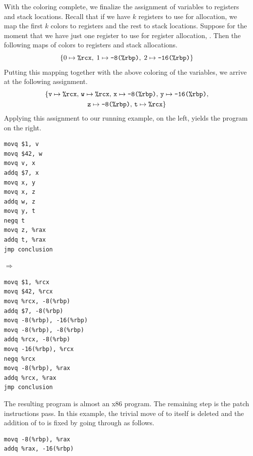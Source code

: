 \documentclass[11pt]{book}
\begin{document}
With the coloring complete, we finalize the assignment of variables to
registers and stack locations. Recall that if we have $k$ registers to
use for allocation, we map the first $k$ colors to registers and the
rest to stack locations.  Suppose for the moment that we have just one
register to use for register allocation, . Then the following
maps of colors to registers and stack allocations.
\[
  \{ 0 \mapsto \texttt{\%rcx}, \; 1 \mapsto \texttt{-8(\%rbp)}, \; 2 \mapsto \texttt{-16(\%rbp)} \}
\]
Putting this mapping together with the above coloring of the
variables, we arrive at the following assignment.
\begin{gather*}
  \{ \mathtt{v} \mapsto \texttt{\%rcx}, \,
     \mathtt{w} \mapsto \texttt{\%rcx},  \,
     \mathtt{x} \mapsto \texttt{-8(\%rbp)}, \,
     \mathtt{y} \mapsto \texttt{-16(\%rbp)}, \\
     \mathtt{z} \mapsto \texttt{-8(\%rbp)}, \,
     \mathtt{t} \mapsto \texttt{\%rcx} \}
\end{gather*}
Applying this assignment to our running example, on the left, yields
the program on the right.
\begin{center}
  \begin{minipage}{0.3\textwidth}
\begin{lstlisting}
movq $1, v
movq $42, w
movq v, x
addq $7, x
movq x, y
movq x, z
addq w, z
movq y, t
negq t
movq z, %rax
addq t, %rax
jmp conclusion
\end{lstlisting}
\end{minipage}
$\Rightarrow\qquad$
\begin{minipage}{0.45\textwidth}
\begin{lstlisting}
movq $1, %rcx
movq $42, %rcx
movq %rcx, -8(%rbp)
addq $7, -8(%rbp)
movq -8(%rbp), -16(%rbp)
movq -8(%rbp), -8(%rbp)
addq %rcx, -8(%rbp)
movq -16(%rbp), %rcx
negq %rcx
movq -8(%rbp), %rax
addq %rcx, %rax
jmp conclusion
\end{lstlisting}
\end{minipage}
\end{center}

The resulting program is almost an x86 program. The remaining step is
the patch instructions pass. In this example, the trivial move of
 to itself is deleted and the addition of
 to  is fixed by going through
 as follows.
\begin{lstlisting}
movq -8(%rbp), %rax
addq %rax, -16(%rbp)
\end{lstlisting}
\end{document}
